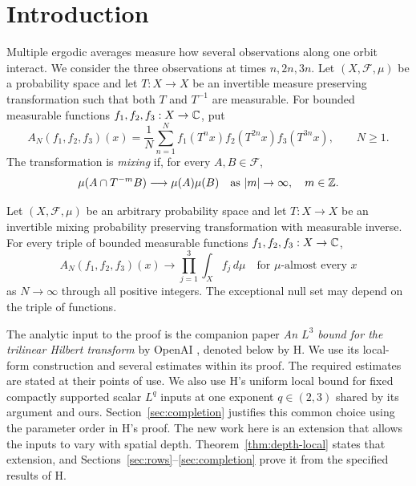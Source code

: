 \section{Introduction}\label{sec:introduction}

Multiple ergodic averages measure how several observations along one orbit
interact.  We consider the three observations at times $n,2n,3n$.  Let
$(X,\mathcal F,\mu)$ be a probability space and let $T:X\to X$ be an
invertible measure preserving transformation such that both $T$ and $T^{-1}$
are measurable.  For bounded measurable functions $f_1,f_2,f_3:X\to\mathbb C$, put
\begin{equation}
 A_N(f_1,f_2,f_3)(x)
 =\frac1N\sum_{n=1}^N
       f_1(T^n x)f_2(T^{2n}x)f_3(T^{3n}x),\qquad N\ge1.
 \label{eq:main-average}
\end{equation}
The transformation is \emph{mixing} if, for every $A,B\in\mathcal F$,
\begin{equation}
 \mu(A\cap T^{-m}B)\longrightarrow\mu(A)\mu(B)
 \quad\text{as }|m|\to\infty,\quad m\in\mathbb Z.
 \label{eq:mixing}
\end{equation}

\begin{theorem}\label{thm:main}
Let $(X,\mathcal F,\mu)$ be an arbitrary probability space and let
$T:X\to X$ be an invertible mixing probability preserving transformation
with measurable inverse.  For every triple of bounded measurable functions
$f_1,f_2,f_3:X\to\mathbb C$,
\[
 A_N(f_1,f_2,f_3)(x)
 \longrightarrow \prod_{j=1}^3\int_X f_j\,d\mu
 \quad\text{for $\mu$-almost every }x
\]
as $N\to\infty$ through all positive integers.  The exceptional null set
may depend on the triple of functions.
\end{theorem}

The analytic input to the proof is the companion paper
\emph{An $L^3$ bound for the trilinear Hilbert transform} by OpenAI
\cite{H}, denoted below by H.  We use its local-form construction and
several estimates within its proof.  The required estimates are stated at
their points of use.  We also use H's uniform local bound for fixed compactly supported
scalar $L^q$ inputs at one exponent $q\in(2,3)$ shared by its argument and ours.
Section~\ref{sec:completion} justifies this common choice using the
parameter order in H's proof.  The new work here is an extension that allows
the inputs to vary with spatial depth.  Theorem~\ref{thm:depth-local} states
that extension, and
Sections~\ref{sec:rows}--\ref{sec:completion} prove it from the specified
results of H.

